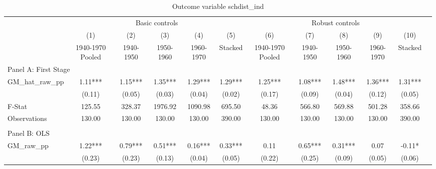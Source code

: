  \begin{table}[htbp]\centering {} \begin{threeparttable} \caption{Outcome variable schdist\_ind} \begin{tabular}{l*{11}{c}} \toprule
          &\multicolumn{5}{c}{Basic controls}                                   &\multicolumn{5}{c}{Robust controls}                                  \\\cmidrule(lr){2-6}\cmidrule(lr){7-11}
          &\multicolumn{1}{c}{(1)}&\multicolumn{1}{c}{(2)}&\multicolumn{1}{c}{(3)}&\multicolumn{1}{c}{(4)}&\multicolumn{1}{c}{(5)}&\multicolumn{1}{c}{(6)}&\multicolumn{1}{c}{(7)}&\multicolumn{1}{c}{(8)}&\multicolumn{1}{c}{(9)}&\multicolumn{1}{c}{(10)}\\
          &\multicolumn{1}{c}{1940-1970 Pooled}&\multicolumn{1}{c}{1940-1950}&\multicolumn{1}{c}{1950-1960}&\multicolumn{1}{c}{1960-1970}&\multicolumn{1}{c}{Stacked}&\multicolumn{1}{c}{1940-1970 Pooled}&\multicolumn{1}{c}{1940-1950}&\multicolumn{1}{c}{1950-1960}&\multicolumn{1}{c}{1960-1970}&\multicolumn{1}{c}{Stacked}\\
\cmidrule(lr){1-11}
\multicolumn{10}{l}{Panel A: First Stage}\\
\cmidrule(lr){1-11}
GM\_hat\_raw\_pp&      1.11***&      1.15***&      1.35***&      1.29***&      1.29***&      1.25***&      1.08***&      1.48***&      1.36***&      1.31***\\
          &    (0.11)   &    (0.05)   &    (0.03)   &    (0.04)   &    (0.02)   &    (0.17)   &    (0.09)   &    (0.04)   &    (0.12)   &    (0.05)   \\
\midrule
F-Stat    &    125.55   &    328.37   &   1976.92   &   1090.98   &    695.50   &     48.36   &    566.80   &    569.88   &    501.28   &    358.66   \\
Observations&    130.00   &    130.00   &    130.00   &    130.00   &    390.00   &    130.00   &    130.00   &    130.00   &    130.00   &    390.00   \\
\cmidrule[\heavyrulewidth](lr){1-11} \\ \cmidrule[\heavyrulewidth](lr){1-11}
\multicolumn{10}{l}{Panel B: OLS}\\
\cmidrule(lr){1-11}
GM\_raw\_pp &      1.22***&      0.79***&      0.51***&      0.16***&      0.33***&      0.11   &      0.65***&      0.31***&      0.07   &     -0.11*  \\
          &    (0.23)   &    (0.23)   &    (0.13)   &    (0.04)   &    (0.05)   &    (0.22)   &    (0.25)   &    (0.09)   &    (0.05)   &    (0.06)   \\

\end{tabular}
\end{threeparttable}
\end{table}
